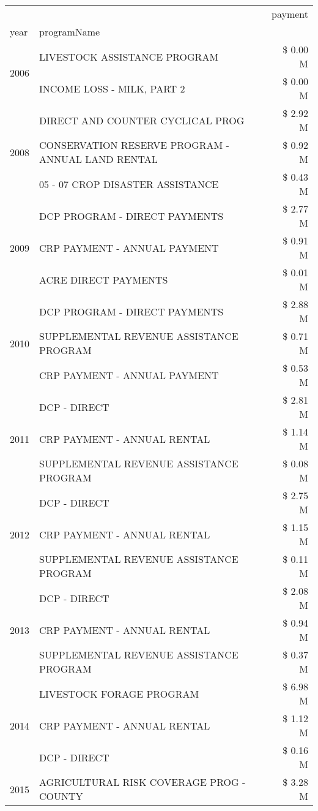 \begin{tabular}{llr}
\toprule
 &  & payment \\
year & programName &  \\
\midrule
\multirow[t]{2}{*}{2006} & LIVESTOCK ASSISTANCE PROGRAM & \$ 0.00 M \\
 & INCOME LOSS - MILK, PART 2 & \$ 0.00 M \\
\cline{1-3}
\multirow[t]{3}{*}{2008} & DIRECT AND COUNTER CYCLICAL PROG & \$ 2.92 M \\
 & CONSERVATION RESERVE PROGRAM - ANNUAL LAND RENTAL & \$ 0.92 M \\
 & 05 - 07 CROP DISASTER ASSISTANCE & \$ 0.43 M \\
\cline{1-3}
\multirow[t]{3}{*}{2009} & DCP PROGRAM - DIRECT PAYMENTS & \$ 2.77 M \\
 & CRP PAYMENT - ANNUAL PAYMENT & \$ 0.91 M \\
 & ACRE DIRECT PAYMENTS & \$ 0.01 M \\
\cline{1-3}
\multirow[t]{3}{*}{2010} & DCP PROGRAM - DIRECT PAYMENTS & \$ 2.88 M \\
 & SUPPLEMENTAL REVENUE ASSISTANCE PROGRAM & \$ 0.71 M \\
 & CRP PAYMENT - ANNUAL PAYMENT & \$ 0.53 M \\
\cline{1-3}
\multirow[t]{3}{*}{2011} & DCP - DIRECT & \$ 2.81 M \\
 & CRP PAYMENT - ANNUAL RENTAL & \$ 1.14 M \\
 & SUPPLEMENTAL REVENUE ASSISTANCE PROGRAM & \$ 0.08 M \\
\cline{1-3}
\multirow[t]{3}{*}{2012} & DCP - DIRECT & \$ 2.75 M \\
 & CRP PAYMENT - ANNUAL RENTAL & \$ 1.15 M \\
 & SUPPLEMENTAL REVENUE ASSISTANCE PROGRAM & \$ 0.11 M \\
\cline{1-3}
\multirow[t]{3}{*}{2013} & DCP - DIRECT & \$ 2.08 M \\
 & CRP PAYMENT - ANNUAL RENTAL & \$ 0.94 M \\
 & SUPPLEMENTAL REVENUE ASSISTANCE PROGRAM & \$ 0.37 M \\
\cline{1-3}
\multirow[t]{3}{*}{2014} & LIVESTOCK FORAGE PROGRAM & \$ 6.98 M \\
 & CRP PAYMENT - ANNUAL RENTAL & \$ 1.12 M \\
 & DCP - DIRECT & \$ 0.16 M \\
\cline{1-3}
\multirow[t]{3}{*}{2015} & AGRICULTURAL RISK COVERAGE PROG - COUNTY & \$ 3.28 M \\

\end{tabular}
